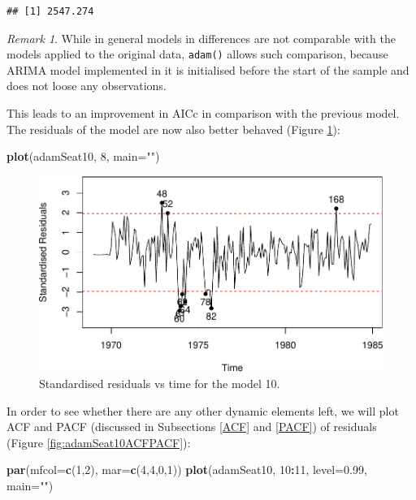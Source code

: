 \documentclass[]{book}
\newenvironment{Shaded}{\begin{snugshade}}{\end{snugshade}}
\newcommand{\DataTypeTok}[1]{\textcolor[rgb]{0.13,0.29,0.53}{#1}}
\newcommand{\DecValTok}[1]{\textcolor[rgb]{0.00,0.00,0.81}{#1}}
\newcommand{\FloatTok}[1]{\textcolor[rgb]{0.00,0.00,0.81}{#1}}
\newcommand{\KeywordTok}[1]{\textcolor[rgb]{0.13,0.29,0.53}{\textbf{#1}}}
\newcommand{\NormalTok}[1]{#1}
\newcommand{\OperatorTok}[1]{\textcolor[rgb]{0.81,0.36,0.00}{\textbf{#1}}}
\newcommand{\StringTok}[1]{\textcolor[rgb]{0.31,0.60,0.02}{#1}}
\theoremstyle{definition}
\theoremstyle{definition}
\theoremstyle{definition}
\theoremstyle{definition}
\theoremstyle{remark}
\newtheorem*{remark}{Remark}
\begin{document}
\begin{verbatim}
## [1] 2547.274
\end{verbatim}

\begin{remark}
While in general models in differences are not comparable with the models applied to the original data, \texttt{adam()} allows such comparison, because ARIMA model implemented in it is initialised before the start of the sample and does not loose any observations.
\end{remark}

This leads to an improvement in AICc in comparison with the previous model. The residuals of the model are now also better behaved (Figure \ref{fig:adamSeat10ResidvsTime}):

\begin{Shaded}
\begin{Highlighting}[]
\KeywordTok{plot}\NormalTok{(adamSeat10, }\DecValTok{8}\NormalTok{, }\DataTypeTok{main=}\StringTok{""}\NormalTok{)}
\end{Highlighting}
\end{Shaded}

\begin{figure}
\centering
\includegraphics{Svetunkov--2022----ADAM_files/figure-latex/adamSeat10ResidvsTime-1.pdf}
\caption{\label{fig:adamSeat10ResidvsTime}Standardised residuals vs time for the model 10.}
\end{figure}

In order to see whether there are any other dynamic elements left, we will plot ACF and PACF (discussed in Subsections \ref{ACF} and \ref{PACF}) of residuals (Figure \ref{fig:adamSeat10ACFPACF}):

\begin{Shaded}
\begin{Highlighting}[]
\KeywordTok{par}\NormalTok{(}\DataTypeTok{mfcol=}\KeywordTok{c}\NormalTok{(}\DecValTok{1}\NormalTok{,}\DecValTok{2}\NormalTok{), }\DataTypeTok{mar=}\KeywordTok{c}\NormalTok{(}\DecValTok{4}\NormalTok{,}\DecValTok{4}\NormalTok{,}\DecValTok{0}\NormalTok{,}\DecValTok{1}\NormalTok{))}
\KeywordTok{plot}\NormalTok{(adamSeat10, }\DecValTok{10}\OperatorTok{:}\DecValTok{11}\NormalTok{, }\DataTypeTok{level=}\FloatTok{0.99}\NormalTok{, }\DataTypeTok{main=}\StringTok{""}\NormalTok{)}
\end{Highlighting}
\end{Shaded}
\end{document}
